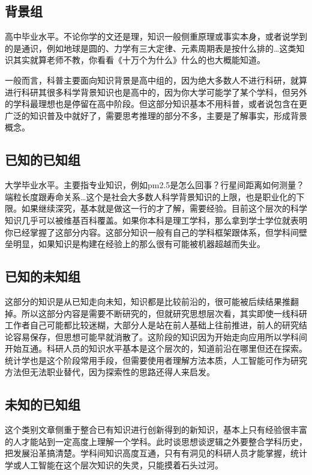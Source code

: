 \documentclass[]{book}
\begin{document}
\subsection{背景组}

高中毕业水平。不论你学的文还是理，知识一般侧重原理或事实本身，或者说学到的是通识，例如地球是圆的、力学有三大定律、元素周期表是按什么排的\ldots{}这类知识其实就算老师不教，你看看《十万个为什么》什么的也大概能知道。

一般而言，科普主要面向知识背景是高中组的，因为绝大多数人不进行科研，就算进行科研其很多科学背景知识也是高中的，因为你大学可能学了某个学科，但另外的学科最理想也是停留在高中阶段。但这部分知识基本不用科普，或者说包含在更广泛的知识普及中就好了，需要思考推理的部分不多，主要是了解事实，形成背景概念。

\subsection{已知的已知组}

大学毕业水平。主要指专业知识，例如pm2.5是怎么回事？行星间距离如何测量？端粒长度跟寿命关系\ldots{}这个是社会大多数人科学背景知识的上限，也是职业化的下限。如果继续深究，基本就是做这一行的才了解，需要经验。目前这个层次的科学知识几乎可以被维基百科覆盖。如果你本科是理工学科，那么拿到学士学位就表明你已经掌握了这部分内容。这部分知识一般有自己的学科框架跟体系，但学科间壁垒明显，如果知识是构建在经验上的那么很有可能被机器超越而失业。

\subsection{已知的未知组}

这部分的知识是从已知走向未知，知识都是比较前沿的，很可能被后续结果推翻掉。所以这部分内容是需要不断研究的，但就研究思想层次看，其实即使一线科研工作者自己可能都比较迷糊，大部分人是站在前人基础上往前推进，前人的研究结论容易保存，但思想可能早就消散了。这阶段的知识因为开始走向应用所以学科间开始互通。科研人员的知识水平基本是这个层次的，知道前沿在哪里但还在探索。统计学也是这个阶段常用手段，但需要使用者理解方法本质，人工智能可作为研究方法但无法职业替代，因为探索性的思路还得人来启发。

\subsection{未知的已知组}

这个类别文章侧重于整合已有知识进行创新得到的新知识，基本上只有经验很丰富的人才能站到一定高度上理解一个学科。此时谈思想谈逻辑之外要整合学科历史，把发展沿革搞清楚。学科间知识高度互通，只有有洞见的科研人员才能掌握，统计学或人工智能在这个层次知识的失灵，只能摸着石头过河。
\end{document}
